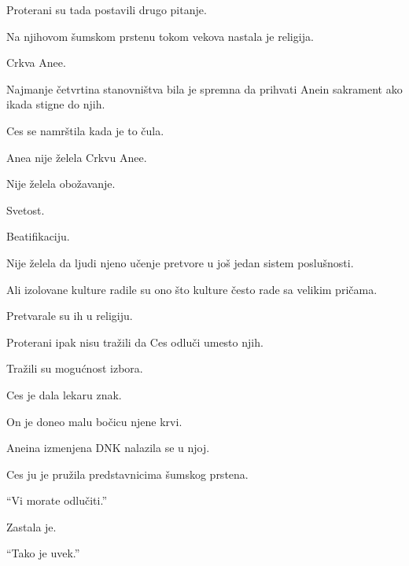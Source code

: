 \bigskip

Proterani su tada postavili drugo pitanje.

\bigskip

Na njihovom šumskom prstenu tokom vekova nastala je religija.

\bigskip

Crkva Anee.

\bigskip

Najmanje četvrtina stanovništva bila je spremna da prihvati Anein sakrament ako ikada stigne do njih.

\bigskip

Ces se namrštila kada je to čula.

\bigskip

Anea nije želela Crkvu Anee.

\bigskip

Nije želela obožavanje.

Svetost.

Beatifikaciju.

\bigskip

Nije želela da ljudi njeno učenje pretvore u još jedan sistem poslušnosti.

\bigskip

Ali izolovane kulture radile su ono što kulture često rade sa velikim pričama.

\bigskip

Pretvarale su ih u religiju.

\bigskip

Proterani ipak nisu tražili da Ces odluči umesto njih.

\bigskip

Tražili su mogućnost izbora.

\bigskip

Ces je dala lekaru znak.

\bigskip

On je doneo malu bočicu njene krvi.

\bigskip

Aneina izmenjena DNK nalazila se u njoj.

\bigskip

Ces ju je pružila predstavnicima šumskog prstena.

\bigskip

``Vi morate odlučiti.''

\bigskip

Zastala je.

\bigskip

``Tako je uvek.''

